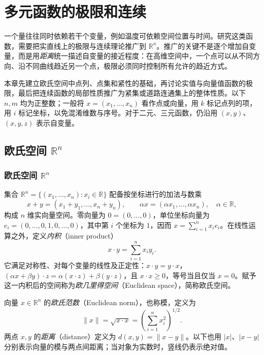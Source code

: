 \setcounter{chapter}{12} %
\chapter{多元函数的极限和连续}
\label{chap:multivariable-limits-and-continuity}


一个量往往同时依赖若干个变量，例如温度可依赖空间位置与时间。研究这类函数，需要把实直线上的极限与连续理论推广到 $\mathbb R^n$。推广的关键不是逐个增加自变量，而是用\emph{距离}统一描述自变量的接近程度：在高维空间中，一个点可以从不同方向、沿不同曲线趋近另一个点，极限必须同时控制所有允许的趋近方式。

本章先建立欧氏空间中点列、点集和紧性的基础，再讨论实值与向量值函数的极限，最后把连续函数的局部性质推广为紧集或道路连通集上的整体性质。以下 $n,m$ 均为正整数；一般将 $x=(x_1,\ldots,x_n)$ 看作点或向量，用 $k$ 标记点列的项，用 $i$ 标记坐标，以免混淆维数与序号。对于二元、三元函数，仍沿用 $(x,y)$、$(x,y,z)$ 表示自变量。

\section{欧氏空间 \texorpdfstring{$\mathbb{R}^n$}{R^n}}
\label{sec:euclidean-space}

\subsection{欧氏空间 \texorpdfstring{$\mathbb{R}^n$}{R^n}}
\label{subsec:euclidean-space}

集合 $\mathbb R^n=\{(x_1,\ldots,x_n):x_i\in\mathbb R\}$ 配备按坐标进行的加法与数乘
\[
    x+y=(x_1+y_1,\ldots,x_n+y_n),\qquad
    \alpha x=(\alpha x_1,\ldots,\alpha x_n),\quad \alpha\in\mathbb R,
\]
构成 $n$ 维实向量空间。零向量为 $0=(0,\ldots,0)$，单位坐标向量为 $e_i=(0,\ldots,0,1,0,\ldots,0)$，其中第 $i$ 个坐标为 $1$，因而 $x=\sum_{i=1}^n x_i e_i$。在线性运算之外，定义\emph{内积}（inner product）
\[
    x\cdot y=\sum_{i=1}^n x_i y_i.
\]
它满足对称性、对每个变量的线性及正定性：$x\cdot y=y\cdot x$，$(\alpha x+\beta y)\cdot z=\alpha(x\cdot z)+\beta(y\cdot z)$，且 $x\cdot x\geq0$，等号当且仅当 $x=0$。赋予这一内积后的空间称为\emph{欧几里得空间}（Euclidean space），简称欧氏空间。

\begin{definition}
\label{def:euclidean-norm-and-distance}
向量 $x\in\mathbb R^n$ 的\emph{欧氏范数}（Euclidean norm），也称模，定义为
\[
    \|x\|=\sqrt{x\cdot x}=\left(\sum_{i=1}^n x_i^2\right)^{1/2}.
\]
两点 $x,y$ 的\emph{距离}（distance）定义为 $d(x,y)=\|x-y\|$。以下也用 $|x|$、$|x-y|$ 分别表示向量的模与两点间距离；当对象为实数时，竖线仍表示绝对值。
\end{definition}

